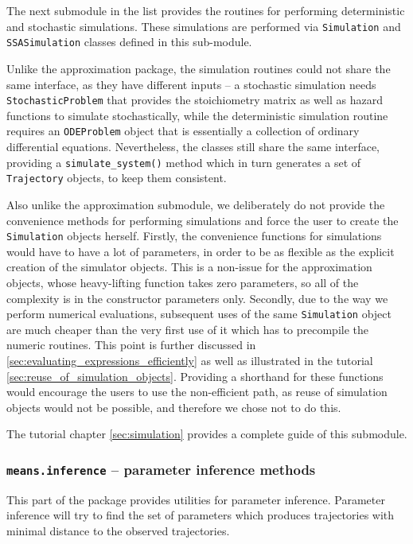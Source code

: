The next submodule in the list provides the routines for performing deterministic and stochastic simulations.
These simulations are performed via \verb"Simulation" and \verb"SSASimulation" classes defined in this sub-module.

Unlike the approximation package, the simulation routines could not share the same interface, as they have different inputs -- a stochastic simulation needs \verb"StochasticProblem" that provides the stoichiometry matrix as well as hazard functions to simulate stochastically, while the deterministic simulation routine requires an \verb"ODEProblem" object that is essentially a collection of ordinary differential equations.
Nevertheless, the classes still share the same interface, providing a \verb"simulate_system()" method which in turn generates a set of \verb"Trajectory" objects, to keep them consistent.

Also unlike the approximation submodule, we deliberately do not provide the convenience methods for performing simulations and force the user to create the \verb"Simulation" objects herself. 
Firstly, the convenience functions for simulations would have to have a lot of parameters, in order to be as flexible as the explicit creation of the simulator objects. 
This is a non-issue for the approximation objects, whose heavy-lifting function takes zero parameters, so all of the complexity is in the constructor parameters only.
Secondly, due to the way we perform numerical evaluations, subsequent uses of the same \verb"Simulation" object are much cheaper than the very first use of it which has to precompile the numeric routines.
This point is further discussed in \autoref{sec:evaluating_expressions_efficiently} as well as illustrated in the tutorial \autoref{sec:reuse_of_simulation_objects}. 
Providing a shorthand for these functions would encourage the users to use the non-efficient path, as reuse of simulation objects would not be possible, and therefore we chose not to do this.

The tutorial chapter \autoref{sec:simulation} provides a complete guide of this submodule.

\subsubsection{{\tt means.inference} -- parameter inference methods}
This part of the package provides utilities for parameter inference.
Parameter inference will try to find the set of parameters which
produces trajectories with minimal distance to the observed trajectories.

